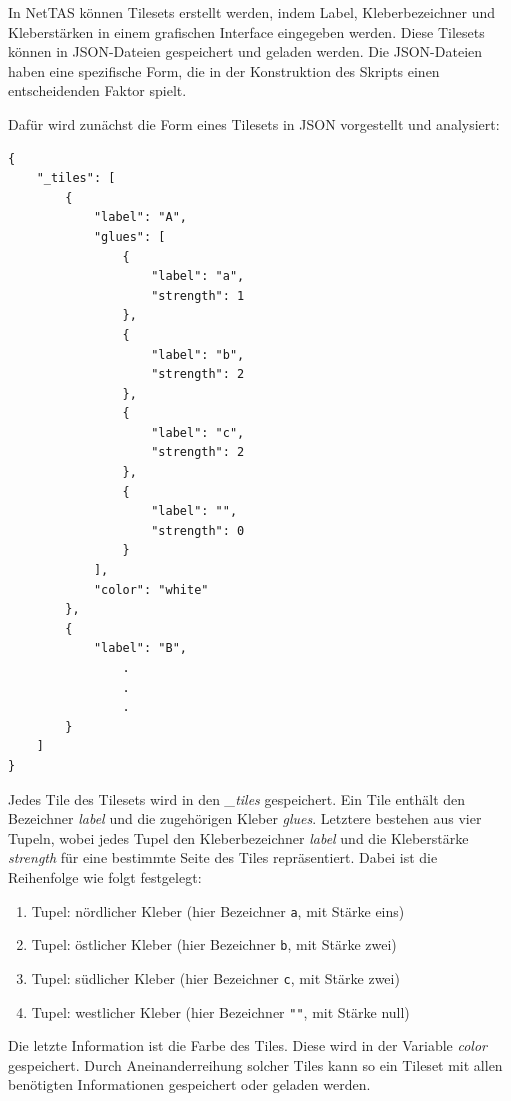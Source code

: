 In NetTAS können Tilesets erstellt werden, indem Label, Kleberbezeichner und Kleberstärken in einem grafischen Interface eingegeben werden. Diese Tilesets können in JSON-Dateien gespeichert und geladen werden. Die JSON-Dateien haben eine spezifische Form, die in der Konstruktion des Skripts einen entscheidenden Faktor spielt. 

Dafür wird zunächst die Form eines Tilesets in JSON vorgestellt und analysiert:
\newpage
\begin{lstlisting}[caption={[Darstellung des Tilesets in einer JSON-Datei]{Darstellung eines beispielhaften Tilesets in JSON-Form. Tiles werden in \texttt{\_tiles} gelistet. Hier ist ein weißes Tile mit dem Bezeichner \texttt{A} und den folgenden Klebern dargestellt: nördlicher Kleber \texttt{a} der Stärke eins, östlicher Kleber \texttt{b} mit Stärke zwei, südlicher Kleber \texttt{c} mit Stärke zwei und keinem Kleber oder Label auf der westlichen Seite des Tiles. Auch wird ein Tile \texttt{B} angedeutet, um zu zeigen, wie weitere Tiles aufgelistet werden.}}, label=lst:tileset_json]
{
    "_tiles": [
        {
            "label": "A",
            "glues": [
                {
                    "label": "a",
                    "strength": 1
                },
                {
                    "label": "b",
                    "strength": 2
                },
                {
                    "label": "c",
                    "strength": 2
                },
                {
                    "label": "",
                    "strength": 0
                }
            ],
            "color": "white"
        },
        {
            "label": "B",
                .
                .
                .
        }
    ]
}
\end{lstlisting}

Jedes Tile des Tilesets wird in den \emph{\_tiles} gespeichert. Ein Tile enthält den Bezeichner \emph{label} und die zugehörigen Kleber \emph{glues}. Letztere bestehen aus vier Tupeln, wobei jedes Tupel den Kleberbezeichner \emph{label} und die Kleberstärke \emph{strength} für eine bestimmte Seite des Tiles repräsentiert. Dabei ist die Reihenfolge wie folgt festgelegt:
\begin{enumerate}
    \item Tupel: nördlicher Kleber (hier Bezeichner \texttt{a}, mit Stärke eins)
    \item Tupel: östlicher Kleber (hier Bezeichner \texttt{b}, mit Stärke zwei)
    \item Tupel: südlicher Kleber (hier Bezeichner \texttt{c}, mit Stärke zwei)
    \item Tupel: westlicher Kleber (hier Bezeichner \verb|""|, mit Stärke null)
\end{enumerate}
Die letzte Information ist die Farbe des Tiles. Diese wird in der Variable \emph{color} gespeichert. Durch Aneinanderreihung solcher Tiles kann so ein Tileset mit allen benötigten Informationen gespeichert oder geladen werden.

